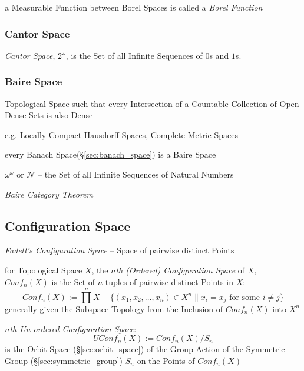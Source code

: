a Measurable Function between Borel Spaces is called a \emph{Borel Function}



\subsubsection{Cantor Space}\label{sec:cantor_space}

\emph{Cantor Space}, $2^{\omega}$, is the Set of all Infinite
Sequences of $0$s and $1$s.



\subsubsection{Baire Space}\label{sec:baire_space}

Topological Space such that every Intersection of a Countable Collection of Open
Dense Sets is also Dense

e.g. Locally Compact Hausdorff Spaces, Complete Metric Spaces

every Banach Space(\S\ref{sec:banach_space}) is a Baire Space

$\omega^{\omega}$ or $\mathcal{N}$ -- the Set of all Infinite Sequences of
Natural Numbers

\emph{Baire Category Theorem}



\subsection{Configuration Space}\label{sec:configuration_space}

\emph{Fadell's Configuration Space} -- Space of pairwise distinct Points

for Topological Space $X$, the \emph{$n$th (Ordered) Configuration Space} of
$X$, $Conf_n(X)$ is the Set of $n$-tuples of pairwise distinct Points in $X$:
\[
  Conf_n(X) := \prod^n X - \{(x_1, x_2, \ldots, x_n) \in X^n
    \| x_i = x_j \text{ for some } i \neq j \}
\]
generally given the Subspace Topology from the Inclusion of $Conf_n(X)$ into
$X^n$

\emph{$n$th Un-ordered Configuration Space}:
\[
  UConf_n(X) := Conf_n(X)/S_n
\]
is the Orbit Space (\S\ref{sec:orbit_space}) of the Group Action of the
Symmetric Group (\S\ref{sec:symmetric_group}) $S_n$ on the Points of $Conf_n(X)$

